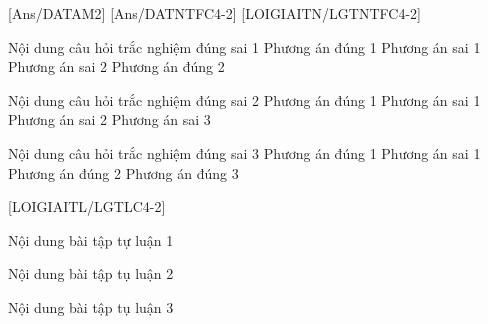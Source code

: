 [Ans/DATAM2]
[Ans/DATNTFC4-2]
\luulgEXTF
{}[LOIGIAITN/LGTNTFC4-2]
\begin{ex}
	Nội dung câu hỏi trắc nghiệm đúng sai 1
	\choiceTF
	{\True Phương án đúng 1}
	{ Phương án sai 1}
	{Phương án sai 2}
	{\True Phương án đúng 2}
\end{ex}
\begin{ex}
	Nội dung câu hỏi trắc nghiệm đúng sai 2
	\choiceTF
	{\True Phương án đúng 1}
	{ Phương án sai 1}
	{ Phương án sai 2}
	{Phương án sai 3}
\end{ex}
\begin{ex}
	Nội dung câu hỏi trắc nghiệm đúng sai 3
	\choiceTF
	{\True Phương án đúng 1}
	{ Phương án sai 1}
	{\True Phương án đúng 2}
	{\True Phương án đúng 3}
\end{ex}

[LOIGIAITL/LGTLC4-2]
\luuloigiaibt
\begin{bt}
	Nội dung bài tập tự luận 1
\end{bt}
\begin{bt}
	Nội dung bài tập tụ luận 2
\end{bt}
\begin{bt}
	Nội dung bài tập tụ luận 3
\end{bt}

